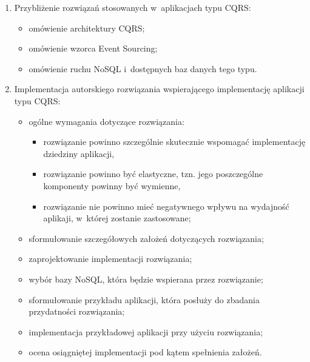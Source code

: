 \begin{enumerate}

 \item Przybliżenie rozwiązań stosowanych w~aplikacjach typu CQRS:
  \begin{itemize}
   \item omówienie architektury CQRS;
   \item omówienie wzorca Event Sourcing;
   \item omówienie ruchu NoSQL i~dostępnych baz danych tego typu.
  \end{itemize}

 \item Implementacja autorskiego rozwiązania wspierającego implementację aplikacji typu CQRS:
  \begin{itemize}
   \item ogólne wymagania dotyczące rozwiązania:
    \begin{itemize}
     \item rozwiązanie powinno szczególnie skutecznie wspomagać implementację dziedziny aplikacji,
     \item rozwiązanie powinno być elastyczne, tzn. jego poszczególne komponenty powinny być wymienne,
     \item rozwiązanie nie powinno mieć negatywnego wpływu na wydajność aplikaji, w~której zostanie zastosowane;
    \end{itemize}
   \item sformułowanie szczegółowych założeń dotyczących rozwiązania;
   \item zaprojektowanie implementacji rozwiązania;
   \item wybór bazy NoSQL, która będzie wspierana przez rozwiązanie;
   \item sformułowanie przykładu aplikacji, która posłuży do zbadania przydatności rozwiązania;
   \item implementacja przykładowej aplikacji przy użyciu rozwiązania;
   \item ocena osiągniętej implementacji pod kątem spełnienia założeń.
  \end{itemize}
 

\end{enumerate}
